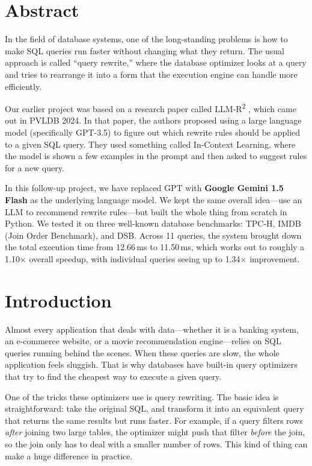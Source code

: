 \documentclass[12pt,a4paper]{article}
\begin{document}
\section*{Abstract}

In the field of database systems, one of the long-standing problems is how to make SQL queries run faster without changing what they return. The usual approach is called ``query rewrite,'' where the database optimizer looks at a query and tries to rearrange it into a form that the execution engine can handle more efficiently.

Our earlier project was based on a research paper called LLM-R\textsuperscript{2} \cite{llmr2}, which came out in PVLDB 2024. In that paper, the authors proposed using a large language model (specifically GPT-3.5) to figure out which rewrite rules should be applied to a given SQL query. They used something called In-Context Learning, where the model is shown a few examples in the prompt and then asked to suggest rules for a new query.

In this follow-up project, we have replaced GPT with \textbf{Google Gemini 1.5 Flash} as the underlying language model. We kept the same overall idea---use an LLM to recommend rewrite rules---but built the whole thing from scratch in Python. We tested it on three well-known database benchmarks: TPC-H, IMDB (Join Order Benchmark), and DSB. Across 11 queries, the system brought down the total execution time from 12.66\,ms to 11.50\,ms, which works out to roughly a 1.10$\times$ overall speedup, with individual queries seeing up to 1.34$\times$ improvement.

\newpage

\section{Introduction}

Almost every application that deals with data---whether it is a banking system, an e-commerce website, or a movie recommendation engine---relies on SQL queries running behind the scenes. When these queries are slow, the whole application feels sluggish. That is why databases have built-in query optimizers that try to find the cheapest way to execute a given query.

One of the tricks these optimizers use is query rewriting. The basic idea is straightforward: take the original SQL, and transform it into an equivalent query that returns the same results but runs faster. For example, if a query filters rows \emph{after} joining two large tables, the optimizer might push that filter \emph{before} the join, so the join only has to deal with a smaller number of rows. This kind of thing can make a huge difference in practice.
\end{document}
